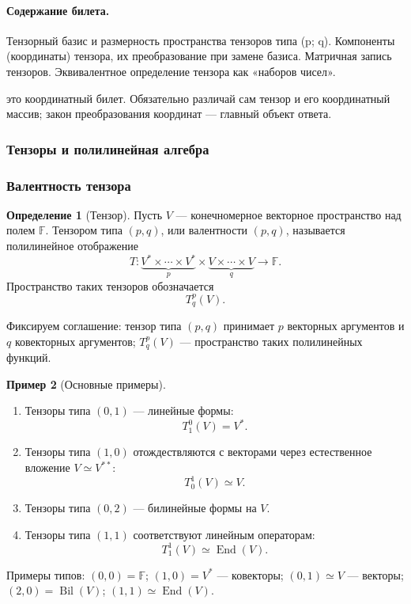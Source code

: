 \documentclass[12pt,a4paper]{article}
\theoremstyle{definition}
\newtheorem{definition}{Определение}[section]
\newtheorem{example}[definition]{Пример}
\theoremstyle{plain}
\theoremstyle{remark}
\newenvironment{planadd}{\begin{planbox}}{\end{planbox}}
\newenvironment{knowledgefix}{\begin{clarifybox}}{\end{clarifybox}}
\newcommand{\F}{\mathbb{F}}
\newcommand{\End}{\operatorname{End}}
\begin{document}
\paragraph{Содержание билета.} Тензорный базис и размерность пространства тензоров типа (p; q). Компоненты (координаты) тензора, их преобразование при замене базиса. Матричная запись тензоров. Эквивалентное определение тензора как «наборов чисел».

\begin{planadd}

это координатный билет. Обязательно различай сам тензор и его координатный массив; закон преобразования координат — главный объект ответа.

\end{planadd}

\subsubsection{Тензоры и полилинейная алгебра}

\subsubsection*{Валентность тензора}

\begin{definition}[Тензор]
Пусть $V$ --- конечномерное векторное пространство над полем $\F$.
Тензором типа $(p,q)$, или валентности $(p,q)$, называется полилинейное отображение
\[
    T:\underbrace{V^*\times\cdots\times V^*}_{p}
      \times
      \underbrace{V\times\cdots\times V}_{q}
      \longrightarrow \F.
\]
Пространство таких тензоров обозначается
\[
    T^p_q(V).
\]
\begin{knowledgefix}
Фиксируем соглашение: тензор типа \((p,q)\) принимает \(p\) векторных аргументов и \(q\) ковекторных аргументов; \(T^p_q(V)\) — пространство таких полилинейных функций.
\end{knowledgefix}
\end{definition}

\begin{example}[Основные примеры]
\begin{enumerate}[label=\arabic*)]
    \item Тензоры типа $(0,1)$ --- линейные формы:
    \[
        T^0_1(V)=V^*.
    \]
    \item Тензоры типа $(1,0)$ отождествляются с векторами через естественное вложение $V\simeq V^{**}$:
    \[
        T^1_0(V)\simeq V.
    \]
    \item Тензоры типа $(0,2)$ --- билинейные формы на $V$.
    \item Тензоры типа $(1,1)$ соответствуют линейным операторам:
    \[
        T^1_1(V)\simeq \End(V).
    \]
\end{enumerate}
\begin{knowledgefix}
Примеры типов: \((0,0)=\F\); \((1,0)=V^*\) — ковекторы; \((0,1)\simeq V\) — векторы; \((2,0)=\operatorname{Bil}(V)\); \((1,1)\simeq\End(V)\).
\end{knowledgefix}
\end{example}
\end{document}
